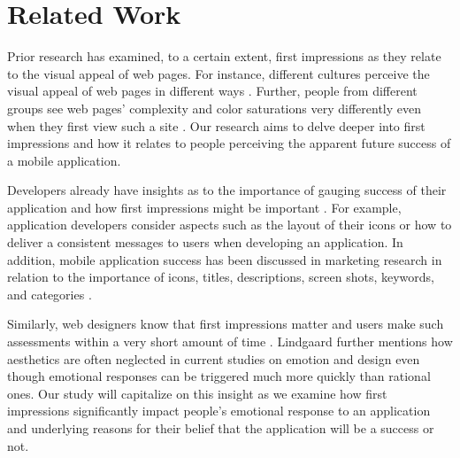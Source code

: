 \section{Related Work}


Prior research has examined, to a certain extent, first impressions as they relate to the visual appeal of web pages. For instance, different cultures perceive the visual appeal of web pages in different ways \cite{Reinecke:2013:PUF:2470654.2481281}. Further, people from different groups see web pages' complexity and color saturations very differently even when they first view such a site \cite{Reinecke:2013:PUF:2470654.2481281}. Our research aims to delve deeper into first impressions and how it relates to people perceiving the apparent future success of a mobile application.

Developers already have insights as to the importance of gauging success of their application and how first impressions might be important \cite{wooldridge2010the}. For example, application developers consider aspects such as the layout of their icons or how to deliver a consistent messages to users when developing an application.  In addition, mobile application success has been discussed in marketing research in relation to the importance of icons, titles, descriptions, screen shots, keywords, and categories \cite{mureta12:app}.


Similarly, web designers know that first impressions matter and users make such assessments within a very short amount of time \cite{needsource-attentionwebdesigners}. Lindgaard \cite{needsource-attentionwebdesigners} further mentions how aesthetics are often neglected in current studies on emotion and design even though emotional responses can be triggered much more quickly than rational ones. Our study will capitalize on this insight as we examine how first impressions significantly impact people's emotional response to an application and underlying reasons for their belief that the application will be a success or not.
